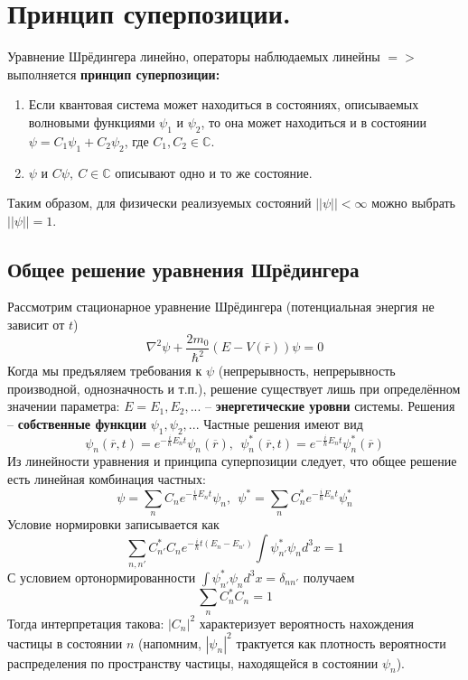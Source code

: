 \section{Принцип суперпозиции.}

Уравнение Шрёдингера линейно, операторы наблюдаемых линейны $=>$ выполняется {\bf принцип суперпозиции:}
\begin{enumerate}
\item Если квантовая система может находиться в состояниях, описываемых волновыми функциями $\psi_1$ и $\psi_2$, то она может находиться и в состоянии $\psi = C_{1}\psi_1 + C_{2}\psi_2$, где $C_1, C_2 \in \mathbb{C}$.
\item $\psi$ и $C\psi,\ C\in\mathbb{C}$ описывают одно и то же состояние.
\end{enumerate}

Таким образом, для физически реализуемых состояний $||\psi|| < \infty$ можно выбрать $||\psi|| = 1$.

\subsection*{Общее решение уравнения Шрёдингера}
Рассмотрим стационарное уравнение Шрёдингера (потенциальная энергия не зависит от $t$)
$$
  \nabla^2\psi + \frac{2m_0}{\hbar^2}\left(E - V(\overline{r})\right)\psi = 0
$$
Когда мы предъяляем требования к $\psi$ (непрерывность, непрерывность производной, однозначность и т.п.), решение существует лишь при определённом значении параметра: $E = E_1, E_2, ...$ -- {\bf энергетические уровни} системы. Решения -- {\bf собственные функции} $\psi_1, \psi_2, ...$
Частные решения имеют вид 
$$
\psi_n (\overline{r}, t) = e^{-\frac{i}{\hbar}E_{n}t}\psi_n(\overline{r}),\ \ \psi^{*}_{n} (\overline{r}, t) = e^{-\frac{i}{\hbar}E_{n}t}\psi^{*}_{n}(\overline{r})
$$
Из линейности уравнения и принципа суперпозиции следует, что общее решение есть линейная комбинация частных:
$$
\psi = \sum_{n}C_n e^{-\frac{i}{\hbar}E_{n}t}\psi_n,\ \ \psi^{*} = \sum_{n}C^{*}_{n} e^{-\frac{i}{\hbar}E_{n}t}\psi^{*}_{n}
$$
Условие нормировки записывается как
$$
\sum_{n, n'}C_{n'}^{*}C_n e^{-\frac{i}{\hbar}t(E_n - E_{n'})}\int\psi_{n'}^{*}\psi_{n}d^{3}x = 1
$$
С условием ортонормированности $\int\psi^{*}_{n'}\psi_{n}d^3x = \delta_{nn'}$ получаем 
$$
\sum_{n}C^{*}_{n}C_n = 1
$$
Тогда интерпретация такова: $|C_n|^2$ характеризует вероятность нахождения частицы в состоянии $n$ (напомним, $|\psi_n|^2$ трактуется как плотность вероятности распределения по пространству частицы, находящейся в состоянии $\psi_n$).

